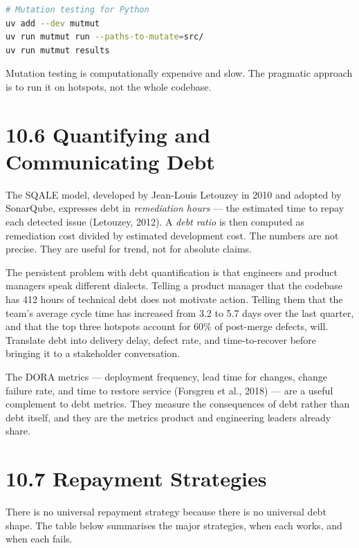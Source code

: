 \documentclass[11pt,a4paper]{book}
\begin{document}
\begin{lstlisting}[language=Bash]
# Mutation testing for Python
uv add --dev mutmut
uv run mutmut run --paths-to-mutate=src/
uv run mutmut results
\end{lstlisting}

Mutation testing is computationally expensive and slow. The pragmatic approach is to run it on hotspots, not the whole codebase.

\medskip

\section{10.6 Quantifying and Communicating Debt}

The SQALE model, developed by Jean-Louis Letouzey in 2010 and adopted by SonarQube, expresses debt in \textit{remediation hours} --- the estimated time to repay each detected issue (Letouzey, 2012). A \textit{debt ratio} is then computed as remediation cost divided by estimated development cost. The numbers are not precise. They are useful for trend, not for absolute claims.

The persistent problem with debt quantification is that engineers and product managers speak different dialects. Telling a product manager that the codebase has 412 hours of technical debt does not motivate action. Telling them that the team's average cycle time has increased from 3.2 to 5.7 days over the last quarter, and that the top three hotspots account for 60\% of post-merge defects, will. Translate debt into delivery delay, defect rate, and time-to-recover before bringing it to a stakeholder conversation.

The DORA metrics --- deployment frequency, lead time for changes, change failure rate, and time to restore service (Forsgren et al., 2018) --- are a useful complement to debt metrics. They measure the consequences of debt rather than debt itself, and they are the metrics product and engineering leaders already share.

\medskip

\section{10.7 Repayment Strategies}

There is no universal repayment strategy because there is no universal debt shape. The table below summarises the major strategies, when each works, and when each fails.
\end{document}
